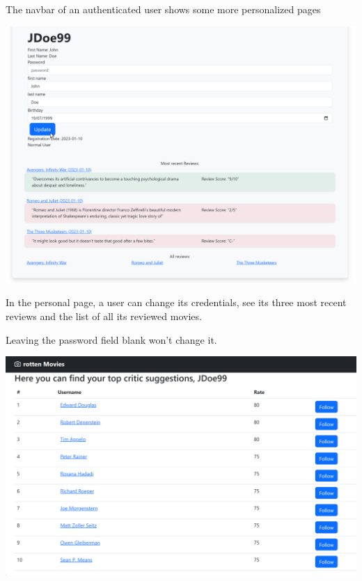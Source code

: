 The navbar of an authenticated user shows some more personalized pages

\begin{center}
\includegraphics[scale=0.45]{../../../images/user_manual/personal_page.png}
\end{center}
 \vspace{5pt}

In the personal page, a user can change its credentials, see its three most recent reviews and the list of all its reviewed movies.

Leaving the password field blank won't change it.

\begin{center}
\includegraphics[scale=0.45]{../../../images/user_manual/suggestions.png} 
\end{center}
\vspace{5pt}

